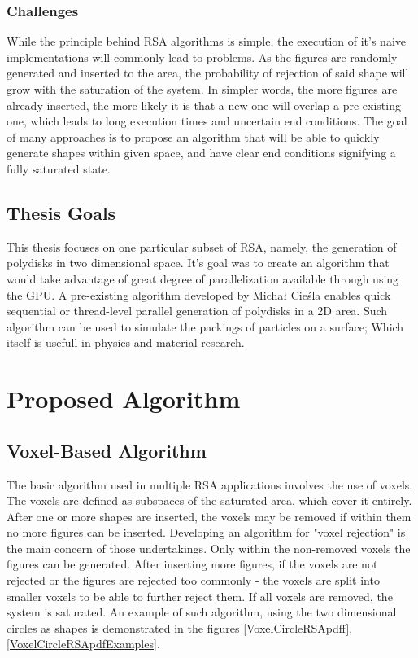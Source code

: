 \documentclass[12pt, oneside]{report}
\begin{document}
\subsection {Challenges}

While the principle behind RSA algorithms is simple, the execution of it's naive implementations will commonly lead to problems. As the figures are randomly generated and inserted to the area, the probability of rejection of said shape will grow with the saturation of the system. In simpler words, the more figures are already inserted, the more likely it is that a new one will overlap a pre-existing one, which leads to long execution times and uncertain end conditions. The goal of many approaches is to propose an algorithm that will be able to quickly generate shapes within given space, and have clear end conditions signifying a fully saturated state.

\section {Thesis Goals}

This thesis focuses on one particular subset of RSA, namely, the generation of polydisks in two dimensional space. It's goal was to create an algorithm that would take advantage of great degree of parallelization available through using the GPU. A pre-existing algorithm developed by Michał Cieśla enables quick sequential or thread-level parallel generation of polydisks in a 2D area. Such algorithm can be used to simulate the packings of particles on a surface; Which itself is usefull in physics and material research.\autocite[1]{ciesla}


\chapter{Proposed Algorithm}

\section {Voxel-Based Algorithm}

The basic algorithm used in multiple RSA applications involves the use of voxels. The voxels are defined as subspaces of the saturated area, which cover it entirely. After one or more shapes are inserted, the voxels may be removed if within them no more figures can be inserted. Developing an algorithm for "voxel rejection" is the main concern of those undertakings. Only within the non-removed voxels the figures can be generated. After inserting more figures, if the voxels are not rejected or the figures are rejected too commonly - the voxels are split into smaller voxels to be able to further reject them. If all voxels are removed, the system is saturated. An example of such algorithm, using the two dimensional circles as shapes is demonstrated in the figures \ref{VoxelCircleRSApdff}, \ref{VoxelCircleRSApdfExamples}.
\end{document}
